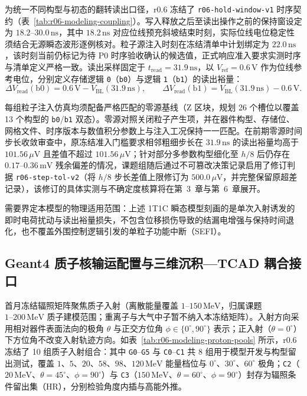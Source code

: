 为统一不同构型与初态的翻转读出口径，r0.6 冻结了 \texttt{r06-hold-window-v1} 时序契约（表~\ref{tab:r06-modeling-coupling}）。写入释放之后至读出操作之前的保持窗设定为 $18.2\text{--}30.0\,\mathrm{ns}$，其中 $18.2\,\mathrm{ns}$ 对应位线预充斜坡结束时刻，实际位线电位稳定性须结合无源瞬态波形逐例核对。粒子源注入时刻在冻结清单中计划绑定为 $22.0\,\mathrm{ns}$，该时刻当前仍标记为待 P0 时序验收确认的候选值，正式响应准入要求实测时序与清单定义严格一致。读出采样固定于 $t_{\mathrm{read}}=31.9\,\mathrm{ns}$，以 $V_{\mathrm{ref}}=0.6\,\mathrm{V}$ 作为位线参考电位，分别定义存储逻辑 \texttt{0}（\texttt{b0}）与逻辑 \texttt{1}（\texttt{b1}）的读出裕量：
\begin{equation}
  \Delta V_{\mathrm{read}}(\mathrm{b0}) = 0.6\,\mathrm{V} - V_{\mathrm{BL}}(31.9\,\mathrm{ns}), \qquad
  \Delta V_{\mathrm{read}}(\mathrm{b1}) = V_{\mathrm{BL}}(31.9\,\mathrm{ns}) - 0.6\,\mathrm{V}.
  \label{eq:readout-margin}
\end{equation}

每组粒子注入仿真均须配备严格匹配的零源基线（Z 区块，规划 26 个槽位以覆盖 13 个构型的 \texttt{b0}/\texttt{b1} 双态）。零源对照关闭粒子产生项，并在器件构型、存储位、网格文件、时序版本与数值积分参数上与注入工况保持一一匹配。在前期零源时间步长收敛审查中，原冻结准入门槛要求相邻粗细步长在 $31.9\,\mathrm{ns}$ 的读出裕量均高于 $101.56\,\mu\mathrm{V}$ 且差值不超过 $101.56\,\mu\mathrm{V}$；针对部分多参数构型细化至 $h/8$ 后仍存在 $0.17\text{--}0.36\,\mathrm{mV}$ 残余偏差的情况，课题组随后通过不可篡改决策记录启用了修订判据 \texttt{r06-step-tol-v2}（将 $h/8$ 步长差值上限修订为 $500.0\,\mu\mathrm{V}$，并完整保留原超差记录），该修订的具体实测与不确定度核算将在第~3~章与第~6~章展开。

需要界定本模型的物理适用范围：上述 1T1C 瞬态模型刻画的是单次入射诱发的即时电荷扰动与读出裕量损失，不包含位移损伤导致的结漏电增强与保持时间退化\cite{nguyen2018sdramleakage}，也不覆盖外围控制逻辑引发的单粒子功能中断（SEFI）\cite{jin2026dramrhbd}。

\subsection{Geant4 质子核输运配置与三维沉积—TCAD 耦合接口}
\label{subsec:ch02-geant4-coupling}

首月冻结辐照矩阵聚焦质子入射（离散能量覆盖 $1\text{--}150\,\mathrm{MeV}$，归属课题 $1\text{--}200\,\mathrm{MeV}$ 质子建模范围；重离子与大气中子暂不纳入本冻结矩阵）。入射方向采用相对器件表面法向的极角 $\theta$ 与正交方位角 $\phi\in\{0^\circ, 90^\circ\}$ 表示；正入射（$\theta=0^\circ$）下方位角不改变入射轨迹方向。如表~\ref{tab:r06-modeling-proton-pools} 所示，r0.6 冻结了 10 组质子入射组合：其中 \texttt{G0}--\texttt{G5} 与 \texttt{C0}--\texttt{C1} 共 8 组用于模型开发与构型留出测试，覆盖 $1$、$5$、$20$、$58$、$98$、$120\,\mathrm{MeV}$ 能量档位与 $0^\circ$、$30^\circ$、$60^\circ$ 极角；\texttt{C2}（$20\,\mathrm{MeV}$、$\theta=45^\circ$、$\phi=90^\circ$）与 \texttt{C3}（$150\,\mathrm{MeV}$、$\theta=60^\circ$、$\phi=90^\circ$）封存为辐照条件留出集（HR），分别检验角度内插与高能外推。


